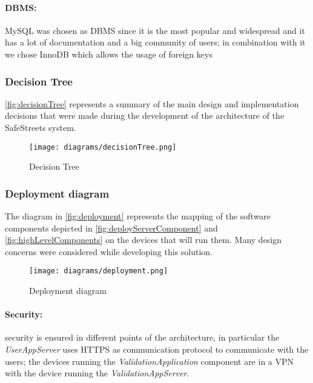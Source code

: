 \paragraph{DBMS:} MySQL was chosen as DBMS since it is the most popular and widespread and it has a lot of documentation and a big community of users; in combination with it we chose InnoDB which allows the usage of foreign keys
\clearpage
\subsubsection{Decision Tree}
\autoref{fig:decisionTree} represents a summary of the main design and implementation decisions that were made during the development of the architecture of the SafeStreets system.\\

\begin{figure}[h!]
	\centering
	\texttt{[image: diagrams/decisionTree.png]}
	\caption{
		\label{fig:decisionTree}  
		Decision Tree
	}
\end{figure}
\clearpage
\subsubsection{Deployment diagram} 

The diagram in \autoref{fig:deployment} represents the mapping of the software components depicted in \autoref{fig:deployServerComponent} and \autoref{fig:highLevelComponents} on the devices that will run them. Many design concerns were considered while developing this solution.\newline\newline\newline

\begin{figure}[ht!]
	\centering
	\texttt{[image: diagrams/deployment.png]}
	\caption{
		\label{fig:deployment} 
		Deployment diagram 
	}
\end{figure}

\clearpage

\paragraph{Security:}security is ensured in different points of the architecture, in particular the \emph{UserAppServer} uses HTTPS as communication protocol to communicate with the users; the devices running the \emph{ValidationApplication} component are in a VPN with the device running the \emph{ValidationAppServer}.
